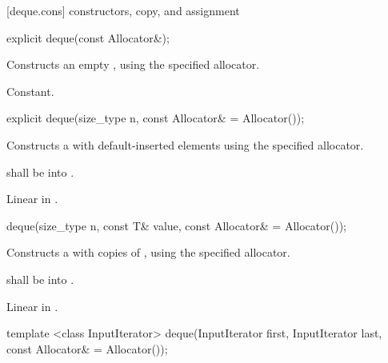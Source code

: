 [deque.cons]{ constructors, copy, and assignment}

%
%
\begin{itemdecl}
explicit deque(const Allocator&);
\end{itemdecl}

\begin{itemdescr}
\pnum
\effects
Constructs an empty
,
using the specified allocator.

\pnum
\complexity
Constant.
\end{itemdescr}

%
%
\begin{itemdecl}
explicit deque(size_type n, const Allocator& = Allocator());
\end{itemdecl}

\begin{itemdescr}
\pnum
\effects Constructs a  with
 default-inserted elements using the specified allocator.

\pnum
\requires {} shall be  into .

\pnum
\complexity Linear in .
\end{itemdescr}

%
%
\begin{itemdecl}
deque(size_type n, const T& value, const Allocator& = Allocator());
\end{itemdecl}

\begin{itemdescr}
\pnum
\effects
Constructs a
with  copies of ,
using the specified allocator.

\pnum
\requires {} shall be  into .

\pnum
\complexity
Linear in .
\end{itemdescr}

%
%
\begin{itemdecl}
template <class InputIterator>
  deque(InputIterator first, InputIterator last, const Allocator& = Allocator());
\end{itemdecl}

